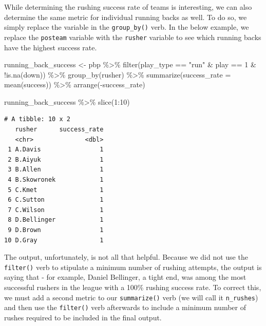 \documentclass[
  letterpaper,
]{krantz}
\newenvironment{Shaded}{\begin{snugshade}}{\end{snugshade}}
\newcommand{\AttributeTok}[1]{\textcolor[rgb]{0.40,0.45,0.13}{#1}}
\newcommand{\DecValTok}[1]{\textcolor[rgb]{0.68,0.00,0.00}{#1}}
\newcommand{\FunctionTok}[1]{\textcolor[rgb]{0.28,0.35,0.67}{#1}}
\newcommand{\NormalTok}[1]{\textcolor[rgb]{0.00,0.23,0.31}{#1}}
\newcommand{\OtherTok}[1]{\textcolor[rgb]{0.00,0.23,0.31}{#1}}
\newcommand{\SpecialCharTok}[1]{\textcolor[rgb]{0.37,0.37,0.37}{#1}}
\newcommand{\StringTok}[1]{\textcolor[rgb]{0.13,0.47,0.30}{#1}}
\begin{document}
While determining the rushing success rate of teams is interesting, we
can also determine the same metric for individual running backs as well.
To do so, we simply replace the variable in the \texttt{group\_by()}
verb. In the below example, we replace the \texttt{posteam} variable
with the \texttt{rusher} variable to see which running backs have the
highest success rate.

\begin{Shaded}
\begin{Highlighting}[]
\NormalTok{running\_back\_success }\OtherTok{\textless{}{-}}\NormalTok{ pbp }\SpecialCharTok{\%\textgreater{}\%}
  \FunctionTok{filter}\NormalTok{(play\_type }\SpecialCharTok{==} \StringTok{"run"} \SpecialCharTok{\&}\NormalTok{ play }\SpecialCharTok{==} \DecValTok{1} \SpecialCharTok{\&} \SpecialCharTok{!}\FunctionTok{is.na}\NormalTok{(down)) }\SpecialCharTok{\%\textgreater{}\%}
  \FunctionTok{group\_by}\NormalTok{(rusher) }\SpecialCharTok{\%\textgreater{}\%}
  \FunctionTok{summarize}\NormalTok{(}\AttributeTok{success\_rate =} \FunctionTok{mean}\NormalTok{(success)) }\SpecialCharTok{\%\textgreater{}\%}
  \FunctionTok{arrange}\NormalTok{(}\SpecialCharTok{{-}}\NormalTok{success\_rate)}

\NormalTok{running\_back\_success }\SpecialCharTok{\%\textgreater{}\%}
  \FunctionTok{slice}\NormalTok{(}\DecValTok{1}\SpecialCharTok{:}\DecValTok{10}\NormalTok{)}
\end{Highlighting}
\end{Shaded}

\begin{verbatim}
# A tibble: 10 x 2
   rusher      success_rate
   <chr>              <dbl>
 1 A.Davis                1
 2 B.Aiyuk                1
 3 B.Allen                1
 4 B.Skowronek            1
 5 C.Kmet                 1
 6 C.Sutton               1
 7 C.Wilson               1
 8 D.Bellinger            1
 9 D.Brown                1
10 D.Gray                 1
\end{verbatim}

The output, unfortunately, is not all that helpful. Because we did not
use the \texttt{filter()} verb to stipulate a minimum number of rushing
attempts, the output is saying that - for example, Daniel Bellinger, a
tight end, was among the most successful rushers in the league with a
100\% rushing success rate. To correct this, we must add a second metric
to our \texttt{summarize()} verb (we will call it \texttt{n\_rushes})
and then use the \texttt{filter()} verb afterwards to include a minimum
number of rushes required to be included in the final output.
\end{document}
